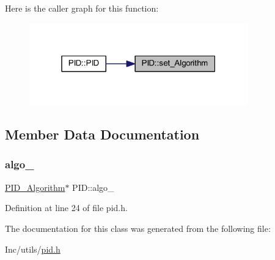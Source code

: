 Here is the caller graph for this function\+:
\nopagebreak
\begin{figure}[H]
\begin{center}
\leavevmode
\includegraphics[width=268pt]{class_p_i_d_af9dc86555b8f221ca9d19f393e179196_icgraph}
\end{center}
\end{figure}


\subsection{Member Data Documentation}
\mbox{\label{class_p_i_d_a00da8f79183718c3326bc5322f77b5f9}} 
\subsubsection{\texorpdfstring{algo\_}{algo\_}}
{\footnotesize\ttfamily \mbox{\hyperlink{class_p_i_d___algorithm}{P\+I\+D\+\_\+\+Algorithm}}$\ast$ P\+I\+D\+::algo\+\_\+\hspace{0.3cm}{\ttfamily [private]}}



Definition at line 24 of file pid.\+h.



The documentation for this class was generated from the following file\+:\begin{DoxyCompactItemize}
\item 
Inc/utils/\mbox{\hyperlink{pid_8h}{pid.\+h}}\end{DoxyCompactItemize}
